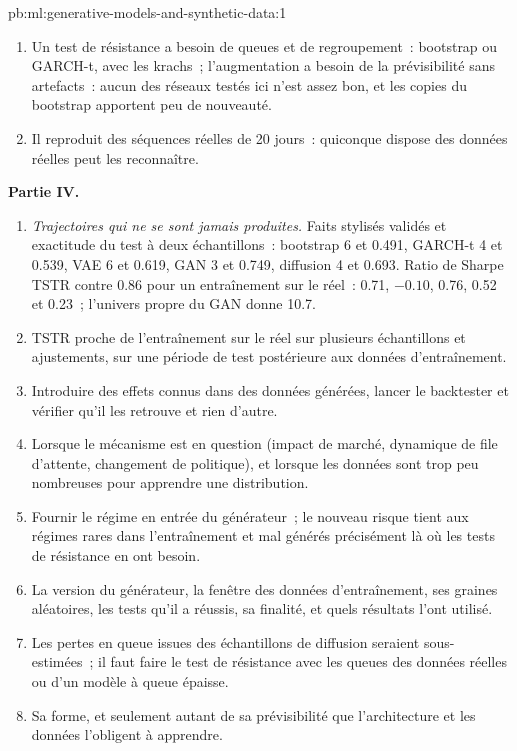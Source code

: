 \begin{solution}{pb:ml:generative-models-and-synthetic-data:1}
\begin{enumerate}[resume]
aléatoire en signe~: $-0.10$ en moyenne, avec un écart-type de 0.65 sur cinq échantillons.
\item Un test de résistance a besoin de queues et de regroupement~: bootstrap ou GARCH-t, avec les krachs~; l'augmentation a besoin de la
prévisibilité sans artefacts~: aucun des réseaux testés ici n'est assez bon, et les copies du bootstrap apportent peu de nouveauté.
\item Il reproduit des séquences réelles de 20 jours~: quiconque dispose des données réelles peut les reconnaître.
\end{enumerate}
\textbf{Partie IV.}
\begin{enumerate}[resume]
\item \emph{Trajectoires qui ne se sont jamais produites.} Faits stylisés validés et exactitude du test à deux échantillons~: bootstrap 6 et 0.491, GARCH-t 4 et 0.539,
VAE 6 et 0.619, GAN 3 et 0.749, diffusion 4 et 0.693. Ratio de Sharpe TSTR contre 0.86 pour un entraînement sur le réel~: 0.71, $-0.10$, 0.76,
0.52 et 0.23~; l'univers propre du GAN donne 10.7.
\item TSTR proche de l'entraînement sur le réel sur plusieurs échantillons et ajustements, sur une période de test postérieure aux données d'entraînement.
\item Introduire des effets connus dans des données générées, lancer le backtester et vérifier qu'il les retrouve et rien d'autre.
\item Lorsque le mécanisme est en question (impact de marché, dynamique de file d'attente, changement de politique), et lorsque les données sont trop peu nombreuses pour
apprendre une distribution.
\item Fournir le régime en entrée du générateur~; le nouveau risque tient aux régimes rares dans l'entraînement et mal générés
précisément là où les tests de résistance en ont besoin.
\item La version du générateur, la fenêtre des données d'entraînement, ses graines aléatoires, les tests qu'il a réussis, sa finalité, et quels résultats
l'ont utilisé.
\item Les pertes en queue issues des échantillons de diffusion seraient sous-estimées~; il faut faire le test de résistance avec les queues des données réelles ou d'un modèle à
queue épaisse.
\item Sa forme, et seulement autant de sa prévisibilité que l'architecture et les données l'obligent à apprendre.
\end{enumerate}
\end{solution}

